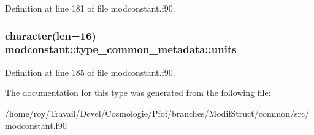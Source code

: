 Definition at line 181 of file modconstant.\-f90.

\hypertarget{structmodconstant_1_1type__common__metadata_ad81415369b15fcdd7537927b1a95dacf}{
\subsubsection[{units}]{\setlength{\rightskip}{0pt plus 5cm}character(len=16) modconstant\-::type\-\_\-common\-\_\-metadata\-::units}}\label{structmodconstant_1_1type__common__metadata_ad81415369b15fcdd7537927b1a95dacf}


Definition at line 185 of file modconstant.\-f90.



The documentation for this type was generated from the following file\-:\begin{DoxyCompactItemize}
\item 
/home/roy/\-Travail/\-Devel/\-Cosmologie/\-Pfof/branches/\-Modif\-Struct/common/src/\hyperlink{modconstant_8f90}{modconstant.\-f90}\end{DoxyCompactItemize}
